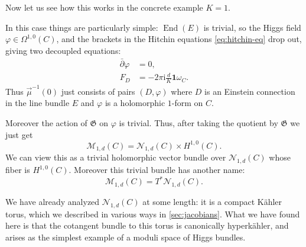 \documentclass[12pt,letterpaper,reqno]{article}
\numberwithin{equation}{section}
\newcommand{\fG}{{\mathfrak G}}
\newcommand{\cM}{\ensuremath{\mathcal M}}
\newcommand{\cN}{\ensuremath{\mathcal N}}
\newcommand{\kahler}{K\"ahler\xspace}
\newcommand{\hk}{hyperk\"ahler\xspace}
\newcommand{\I}{{\mathrm i}}
\newcommand\bid{{\mathbf 1}}
\DeclareMathOperator{\End}{End}
\begin{document}
\begin{example}
Now let us see how this works in the concrete example $K=1$.

In this case things are particularly simple: $\End(E)$ is trivial,
so the Higgs field $\varphi \in \Omega^{1,0}(C)$,
and the brackets in the Hitchin equations \eqref{eq:hitchin-eq}
drop out, giving two decoupled equations:
\begin{subequations}
\begin{align}
  \bar\partial \varphi &= 0, \\
  F_D &= - 2\pi \I \frac{d}{K} \bid \omega_C.
\end{align}
\end{subequations}
Thus $\vec\mu^{-1}(0)$ just consists of pairs $(D,\varphi)$
where $D$ is an Einstein connection in
the line bundle $E$ and $\varphi$ is a holomorphic $1$-form on $C$.

Moreover the action of $\fG$ on $\varphi$ is trivial.
Thus, after taking the quotient by $\fG$ we just get
\begin{equation}
  \cM_{1,d}(C) = \cN_{1,d}(C) \times H^{1,0}(C).
\end{equation}
We can view this as a trivial holomorphic vector bundle over $\cN_{1,d}(C)$ whose
fiber is $H^{1,0}(C)$. Moreover this trivial bundle has another name:
\begin{equation}
  \cM_{1,d}(C) = T^* \cN_{1,d}(C).
\end{equation}

We have already analyzed $\cN_{1,d}(C)$ at some length: it is a compact
\kahler torus, which we described in various ways
in \autoref{sec:jacobians}.
What we have found here is that the cotangent bundle
to this torus is canonically \hk, and arises as the
simplest example of a moduli space of Higgs bundles.
\end{example}
\end{document}

